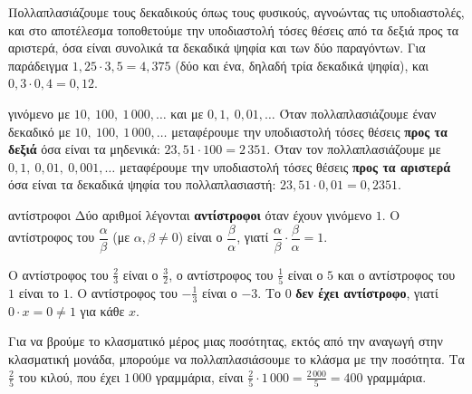 
Πολλαπλασιάζουμε τους δεκαδικούς όπως τους φυσικούς, αγνοώντας τις υποδιαστολές, και στο αποτέλεσμα τοποθετούμε την υποδιαστολή τόσες θέσεις από τα δεξιά προς τα αριστερά, όσα είναι συνολικά τα δεκαδικά ψηφία και των δύο παραγόντων. Για παράδειγμα $1{,}25\cdot3{,}5=4{,}375$ (δύο και ένα, δηλαδή τρία δεκαδικά ψηφία), και $0{,}3\cdot0{,}4=0{,}12$.

\begin{kanonas}{γινόμενο με $10,\ 100,\ 1\,000,\dots$ και με $0{,}1,\ 0{,}01,\dots$}
Όταν πολλαπλασιάζουμε έναν δεκαδικό με $10,\ 100,\ 1\,000,\dots$ μεταφέρουμε την υποδιαστολή τόσες θέσεις \textbf{προς τα δεξιά} όσα είναι τα μηδενικά: $23{,}51\cdot100=2\,351$. Όταν τον πολλαπλασιάζουμε με $0{,}1,\ 0{,}01,\ 0{,}001,\dots$ μεταφέρουμε την υποδιαστολή τόσες θέσεις \textbf{προς τα αριστερά} όσα είναι τα δεκαδικά ψηφία του πολλαπλασιαστή: $23{,}51\cdot0{,}01=0{,}2351$.
\end{kanonas}


\begin{orismos}{αντίστροφοι}
Δύο αριθμοί λέγονται \textbf{αντίστροφοι} όταν έχουν γινόμενο $1$. Ο αντίστροφος του $\dfrac{\alpha}{\beta}$ (με $\alpha,\beta\neq0$) είναι ο $\dfrac{\beta}{\alpha}$, γιατί $\dfrac{\alpha}{\beta}\cdot\dfrac{\beta}{\alpha}=1$.
\end{orismos}

Ο αντίστροφος του $\frac{2}{3}$ είναι ο $\frac{3}{2}$, ο αντίστροφος του $\frac{1}{5}$ είναι ο $5$ και ο αντίστροφος του $1$ είναι το $1$. Ο αντίστροφος του $-\frac{1}{3}$ είναι ο $-3$. Το $0$ \textbf{δεν έχει αντίστροφο}, γιατί $0\cdot x=0\neq1$ για κάθε $x$.


Για να βρούμε το κλασματικό μέρος μιας ποσότητας, εκτός από την αναγωγή στην κλασματική μονάδα, μπορούμε να πολλαπλασιάσουμε το κλάσμα με την ποσότητα. Τα $\frac{2}{5}$ του κιλού, που έχει $1\,000$ γραμμάρια, είναι $\frac{2}{5}\cdot1\,000=\frac{2\,000}{5}=400$ γραμμάρια.

